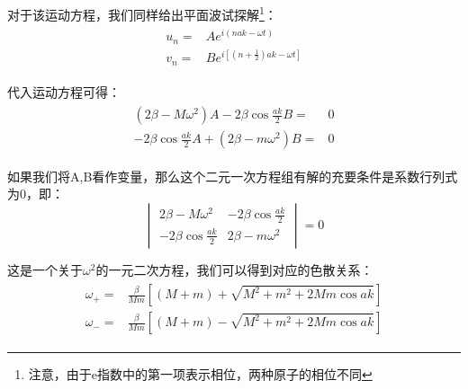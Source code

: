\documentclass{ctexart}
\begin{document}
                对于该运动方程，我们同样给出平面波试探解\footnote{注意，由于e指数中的第一项表示相位，两种原子的相位不同}：
                \begin{align}
                    \begin{split}
                        u_n=&A e^{i(nak-\omega t)}\\
                        v_n=&B e^{i[(n+\frac{1}{2})ak-\omega t]}
                    \end{split}
                \end{align}
                
                代入运动方程可得：
                \begin{align}
                    \begin{split}
                        (2\beta-M\omega^2)A-2\beta\cos{\frac{ak}{2}}B=&0\\
                        -2\beta\cos{\frac{ak}{2}}A+(2\beta-m\omega^2)B=&0
                    \end{split}
                \end{align}
                
                如果我们将A,B看作变量，那么这个二元一次方程组有解的充要条件是系数行列式为0，即：
                \begin{equation}
                    \begin{vmatrix}
                        2\beta-M\omega^2 & -2\beta\cos{\frac{ak}{2}}\\
                        -2\beta\cos{\frac{ak}{2}}& 2\beta-m\omega^2
                    \end{vmatrix}=0
                \end{equation}
                
                这是一个关于$\omega^2$的一元二次方程，我们可以得到对应的色散关系：
                \begin{align}\label{equ3}
                    \begin{split}
                        \omega_+=&\frac{\beta}{Mm}[(M+m)+\sqrt{M^2+m^2+2Mm\cos{ak}}]\\
                        \omega_-=&\frac{\beta}{Mm}[(M+m)-\sqrt{M^2+m^2+2Mm\cos{ak}}]
                    \end{split}
                \end{align}
                
\end{document}
